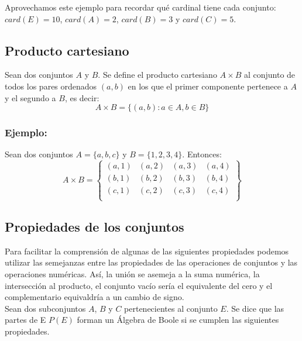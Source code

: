 \documentclass[0_algebra.tex]{subfiles}
\begin{document}
Aprovechamos este ejemplo para recordar qué cardinal tiene cada conjunto: $card(E)=10$,  $card(A)=2$, $card(B)=3$ y $card(C)=5$.

\subsection*{Producto cartesiano}
Sean dos conjuntos $A$ y $B$. Se define el producto cartesiano $A\times B$ al conjunto de todos los pares ordenados $(a,b)$ en los que el primer componente pertenece a $A$ y el segundo a $B$, es decir:
$$
A\times B=\lbrace (a,b): a\in A, b\in B \rbrace
$$

\subsubsection*{Ejemplo:}
Sean dos conjuntos $A=\lbrace a,b,c \rbrace$ y $B=\lbrace 1,2,3,4 \rbrace$. Entonces:
$$
A\times B =
\left\lbrace
\begin{matrix}
(a,1) & (a,2) & (a,3) & (a,4)\\
(b,1) & (b,2) & (b,3) & (b,4)\\
(c,1) & (c,2) & (c,3) & (c,4)\\
\end{matrix}
\right\rbrace
$$

\subsection*{Propiedades de los conjuntos}
Para facilitar la comprensión de algunas de las siguientes propiedades podemos utilizar las semejanzas entre las propiedades de las operaciones de conjuntos y las operaciones numéricas. Así, la unión se asemeja a la suma numérica, la intersección al producto, el conjunto vacío sería el equivalente del cero y el complementario equivaldría a un cambio de signo.\\

Sean dos subconjuntos $A$, $B$ y $C$ pertenecientes al conjunto $E$. Se dice que las partes de E $P(E)$ forman un Álgebra de Boole si se cumplen las siguientes propiedades.\\
\end{document}
